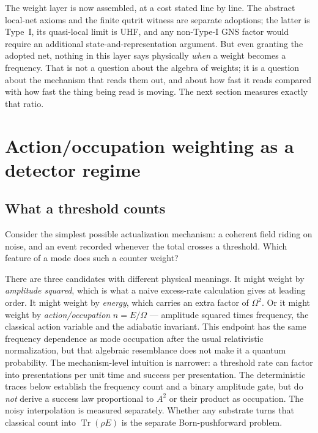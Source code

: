 \documentclass[11pt,a4paper]{article}
\theoremstyle{definition}
\theoremstyle{plain}
\theoremstyle{remark}
\begin{document}
The weight layer is now assembled, at a cost stated line by line. The abstract
local-net axioms and the finite qutrit witness are separate adoptions; the
latter is Type~I, its quasi-local limit is UHF, and any non-Type-I GNS factor
would require an additional state-and-representation argument. But even
granting the adopted net, nothing in this layer says physically
\emph{when} a weight becomes a frequency. That is not a
question about the algebra of weights; it is a question about the
mechanism that reads them out, and about how fast it reads compared with
how fast the thing being read is moving. The next section measures
exactly that ratio.

\section{Action/occupation weighting as a detector regime}
\label{sec:born}

\subsection{What a threshold counts}

Consider the simplest possible actualization mechanism: a coherent field
riding on noise, and an event recorded whenever the total crosses a
threshold. Which feature of a mode does such a counter weight?

There are three candidates with different physical meanings. It might
weight by \emph{amplitude squared}, which is what a naive
excess-rate calculation gives at leading order. It might weight by
\emph{energy}, which carries an extra factor of $\Omega^2$. Or it might
weight by \emph{action/occupation} $n = E/\Omega$ --- amplitude squared
times frequency, the classical action variable and the adiabatic
invariant. This endpoint has the same frequency dependence as mode
occupation after the usual relativistic normalization, but that algebraic
resemblance does not make it a quantum probability. The mechanism-level
intuition is narrower: a threshold rate can factor into presentations per
unit time and success per presentation. The deterministic traces below
establish the frequency count and a binary amplitude gate, but do \emph{not}
derive a success law proportional to $A^2$ or their product as occupation.
The noisy interpolation is measured separately. Whether any substrate turns
that classical count into $\operatorname{Tr}(\rho E)$
is the separate Born-pushforward problem.
\end{document}
